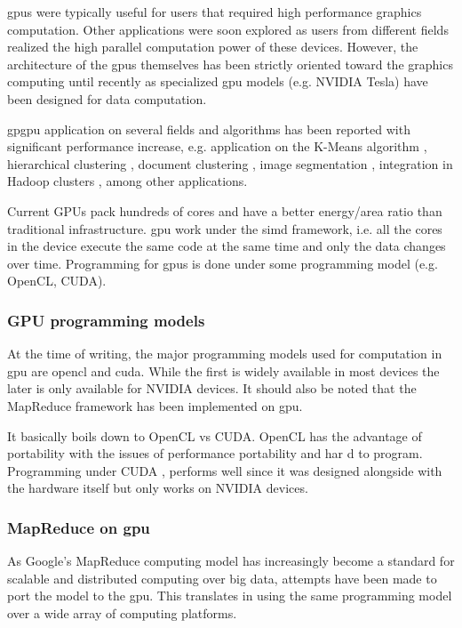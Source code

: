 \gls{gpu}s were typically useful for users that required high performance graphics computation. Other applications were soon explored as users from different fields realized the high parallel computation power of these devices. However, the architecture of the \gls{gpu}s themselves has been strictly oriented toward the graphics computing until recently as specialized \gls{gpu} models (e.g. NVIDIA Tesla) have been designed for data computation.

\gls{gpgpu} application on several fields and algorithms has been reported with significant performance increase, e.g. application on the K-Means algorithm \cite{Bai2009,Wu2011,Zechner2009,Wu2009a}, hierarchical clustering \cite{Shalom2009,ArulShalom2011}, document clustering \cite{gao20xx}, image segmentation \cite{Sirotkovi2012}, integration in Hadoop clusters \cite{Malakar2013,Grossman2013}, among other applications.

Current GPUs pack hundreds of cores and have a better energy/area ratio than traditional infrastructure.
\gls{gpu} work under the \gls{simd} framework, i.e. all the cores in the device execute the same code at the same time and only the data changes over time. Programming for \gls{gpu}s is done under some programming model (e.g. OpenCL, CUDA).



\subsubsection{GPU programming models}

At the time of writing, the major programming models used for computation in \gls{gpu} are \gls{opencl} and \gls{cuda}. While the first is widely available in most devices the later is only available for NVIDIA devices.
It should also be noted that the MapReduce framework has been implemented on \gls{gpu}.


It basically boils down to OpenCL vs CUDA. OpenCL has the advantage of portability with the issues of performance portability and har d to program. Programming under CUDA , performs well since it was designed alongside with the hardware itself but only works on NVIDIA devices.


\subsubsection{MapReduce on \gls{gpu}}
As Google's MapReduce computing model has increasingly become a standard for scalable and distributed computing over big data, attempts have been made to port the model to the \gls{gpu}. This translates in using the same programming model over a wide array of computing platforms.



